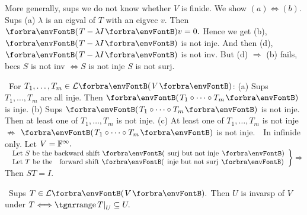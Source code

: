 \vfill
\BulletPointX\NoteForSmall{[5.6]}\TextB{}
More generally, sups we do not know whether $V$ is finide. We show $(a)\Longleftrightarrow(b).$\TextB{}
Sups (a) $\lambda$ is an eigval of $T$ with an eigvec $v.$ Then $\Par{T-\lambda I}v=0.$\TextB{}
Hence we get (b), $\Par{T-\lambda I}$ is not inje. And then (d), $\Par{T-\lambda I}$ is not inv.\TextB{}
But (d) $\Rightarrow$ (b) fails, becs $S$ is not inv $\Longleftrightarrow S$ is not inje \OR $S$ is not surj.\par
\SepLine



\BulletPointX\Tips \,\,\,For $T_1,\dots,T_m\in\Lm{V}$:\TextB{\vspace{-2pt}}
(a) Sups $T_1,\dots,T_m$ are all inje. Then $\Par{T_1\circ\cdots\circ T_m}$ is inje.\TextB{}
(b) Sups $\Par{T_1\circ\cdots\circ T_m}$ is not inje. Then at least one of $T_1,\dots,T_m$ is not inje.\TextB{}
(c) At least one of $T_1,\dots,T_m$ is not inje $\nRightarrow$ $\Par{T_1\circ\cdots\circ T_m}$ is not inje.\TextB{}
\Hc\Example\,\, In infinide only. Let $V={\mathbb{F}}^\infty.$\TextE{}
\;\;\,$\MathRightBrace{l}{$ Let $S$ be the backward shift \Par{ surj but not inje }$\\$ Let $T$ be the \,\,\,\,forward shift \Par{ inje but not surj }$}\Rightarrow$ Then $ST=I.$\PfEnd
\SepLine\pagebreak

\BulletPointX\NoteForSmall{[5.2]}\,\,\,Sups $T\in\Lm{V}.$ Then $U$ is invarsp of $V$ under $T\Longleftrightarrow\range T\mmid_U\subseteq U.$
\SepLine


